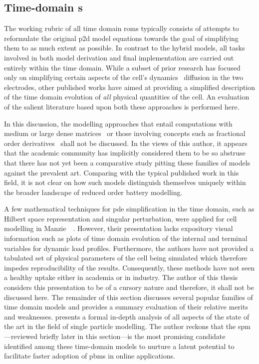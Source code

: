 \subsection{Time-domain  s}\label{subsec:timedomainroms}

The working rubric of all time domain \glspl{rom} typically consists of attempts
to  reformulate the  original  \gls{p2d}  model equations  towards  the goal  of
simplifying  them to  as much  extent  as possible.  In contrast  to the  hybrid
models, all tasks involved in both model derivation and final implementation are
carried out  entirely within the time  domain. While a subset  of prior research
has  focused  only  on  simplifying  certain  aspects  of  the  cell's  dynamics
\eg~diffusion  in  the two  electrodes,  other  published  works have  aimed  at
providing a  simplified description of  the time domain evolution  of \emph{all}
physical quantities of  the cell. An evaluation of the  salient literature based
upon both these approaches is performed here.


In  this discussion,  the  modelling approaches  that  entail computations  with
medium or large dense matrices~\cite{Li2016,Xu2016,Corno2015} or those involving
concepts such  as fractional  order derivatives~\cite{Sabatier2014,Sabatier2015,
Li2017, Mu2017, Wang2017}  shall not be discussed. In the  views of this author,
it appears that  the academic community has implicitly considered  them to be so
abstruse that there has not yet  been a comparative study pitting these families
of models against  the prevalent art. Comparing with the  typical published work
in  this field,  it  is not  clear  on how  such  models distinguish  themselves
uniquely within the broader landscape of reduced order battery modelling.


A few mathematical  techniques for \gls{pde} simplification in  the time domain,
such as Hilbert space representation and singular perturbation, were applied for
cell  modelling in  Manzie~\etal~\cite{Manzie2015}. However,  their presentation
lacks expository  visual information such as  plots of time domain  evolution of
the internal and terminal variables  for dynamic load profiles. Furthermore, the
authors  have  not provided  a  tabulated  set  of  physical parameters  of  the
cell being  simulated which  therefore impedes  reproducibility of  the results.
Consequently, these methods have not seen a healthy uptake either in academia or
in industry. The  author of this thesis  considers this presentation to  be of a
cursory nature  and therefore,  it shall  not be  discussed here.  The remainder
of  this  section discusses  several  popular  families  of time  domain  models
and  provides a  summary evaluation  of  their relative  merits and  weaknesses.
 presents a formal in-depth  analysis of all aspects of the
state of the art  in the field of single particle  modelling. The author reckons
that  the  \gls{spm}---reviewed briefly  later  in  this section---is  the  most
promising  candidate identified  among  these time-domain  models  to nurture  a
latent  potential  to  facilitate  faster  adoption  of  \glspl{pbm}  in  online
applications.


